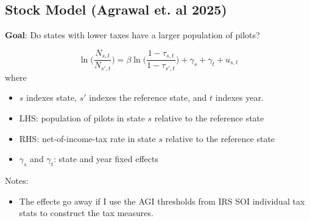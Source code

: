 \documentclass{article}
\begin{document}
\subsection{Stock Model (Agrawal et. al 2025)}
\textbf{Goal}: Do states with lower taxes have a larger population of pilots?

	\begin{equation*}
	\ln \biggr ( \frac{N_{s, t}}{N_{s', t}} \biggr)=  \beta \ln \biggr(\frac{1 - \tau_{s, t}}{1 - \tau_{s', t}} \biggr) + \gamma_s + \gamma_t +  u_{s, t}
\end{equation*}
where
\medskip
\begin{itemize}
	\small
	\item $s$ indexes state, $s'$ indexes the reference state, and $t$ indexes year.
	\medskip
	\item LHS:  population of pilots in state $s$ relative to the reference state
	\medskip
	\item RHS: net-of-income-tax rate in state $s$ relative to the reference state
	\medskip
	\item $ \gamma_s$ and $\gamma_t$:  state and year fixed effects
\end{itemize} 



Notes:
\begin{itemize}
	\item The effects go away if I use the AGI thresholds from IRS SOI individual tax stats to construct the tax measures. 
\end{itemize}
\end{document}
